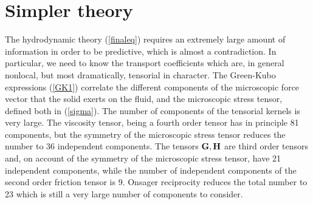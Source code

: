 \documentclass[b5paper,openright,10pt]{book}
\begin{document}

\section{Simpler theory}
The hydrodynamic theory  (\ref{finaleq}) requires
an extremely  large amount of  information in order to  be predictive,
which  is almost  a  contradiction. In particular,
we  need to  know the  transport  coefficients which  are, in  general
nonlocal,  but  most  dramatically,   tensorial  in  character.   The
Green-Kubo expressions  (\ref{GK1}) correlate the  different components
of the  microscopic force vector that  the solid exerts on  the fluid,
and the microscopic stress tensor, defined both in (\ref{sigma}).  The
number  of components  of the  tensorial kernels  is very  large.  The
viscosity  tensor, being  a fourth  order tensor  has in  principle 81
components, but the symmetry of  the microscopic stress tensor reduces
the number  to 36 independent  components.  The tensors  ${\bf G},{\bf
  H}$ are third  order tensors and, on account of  the symmetry of the
microscopic stress  tensor, have 21 independent  components, while the
number of independent  components of the second  order friction tensor
is 9.   Onsager reciprocity reduces  the total  number to 23  which is
still a very large number of components to consider.
\end{document}
